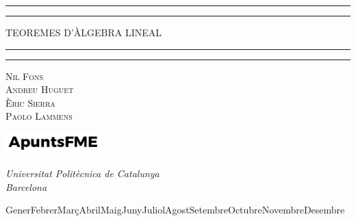 \newcommand{\plogo}{\fbox{$\mathcal{PL}$}} %
{

    \centering %

    \scshape %

    \rule{\textwidth}{1.6pt}\vspace*{-\baselineskip}\vspace*{2pt} %
    \rule{\textwidth}{0.4pt} %

    \vspace{0.40\baselineskip} %

    {\LARGE TEOREMES D'ÀLGEBRA LINEAL} %

    \vspace{0.01\baselineskip} %

    \rule{\textwidth}{0.4pt}\vspace*{-\baselineskip}\vspace{3.2pt} %
    \rule{\textwidth}{1.6pt} %

    \vspace{0.5\baselineskip} %

    {\scshape\large Nil Fons \\ Andreu Huguet \\ Èric Sierra\\ Paolo Lammens\\} %

    \vspace{1.5\baselineskip} %

    \includegraphics[width=3.7cm]{../logo.pdf}

    \vspace{-0.3\baselineskip} %
    
    \textit{Universitat Politècnica de Catalunya \\ Barcelona} %
        
    
    {\ifcase \month \or Gener\or Febrer\or Març\or Abril\or Maig\or Juny\or Juliol\or Agost\or Setembre\or Octubre\or Novembre\or Desembre\fi \:  \number \year} %


}
